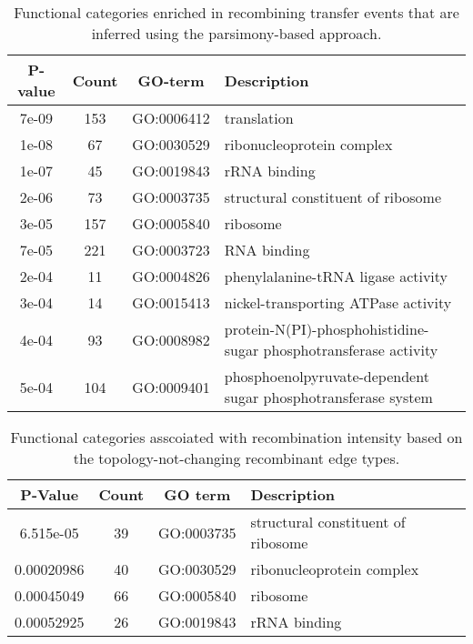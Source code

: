 \documentclass[10pt]{article}
\providecommand{\tabularnewline}{\\}
\begin{document}
\begin{table}
\caption{\label{tab:go-events-recombining}Functional categories enriched in 
recombining transfer events that are inferred using the parsimony-based approach.}
\noindent \begin{centering}
\begin{tabular}{cccl}
\hline 
P-value & Count & GO-term & Description \\
\hline 
7e-09 & 153 & GO:0006412 & translation\\
1e-08 &  67 & GO:0030529 & ribonucleoprotein complex\\
1e-07 &  45 & GO:0019843 & rRNA binding\\
2e-06 &  73 & GO:0003735 & structural constituent of ribosome\\
3e-05 & 157 & GO:0005840 & ribosome\\
7e-05 & 221 & GO:0003723 & RNA binding\\
2e-04 &  11 & GO:0004826 & phenylalanine-tRNA ligase activity\\
3e-04 &  14 & GO:0015413 & nickel-transporting ATPase activity\\
4e-04 &  93 & GO:0008982 & protein-N(PI)-phosphohistidine-sugar phosphotransferase activity\\
5e-04 & 104 & GO:0009401 & phosphoenolpyruvate-dependent sugar phosphotransferase system\\
\hline 
\end{tabular}
\par\end{centering}
\end{table}

\begin{table}
\caption{\label{tab:functional-notopology}Functional categories asscoiated with 
recombination intensity based on the topology-not-changing recombinant edge types.}
\noindent \begin{centering}
\begin{tabular}{cccl}
\hline 
P-Value & Count & GO term & Description\tabularnewline
\hline 
6.515e-05 & 39 & GO:0003735 & structural constituent of ribosome\tabularnewline
0.00020986 & 40 & GO:0030529 & ribonucleoprotein complex\tabularnewline
0.00045049 & 66 & GO:0005840 & ribosome\tabularnewline
0.00052925 & 26 & GO:0019843 & rRNA binding\tabularnewline
\hline 
\end{tabular}
\par\end{centering}
\end{table}
\end{document}

